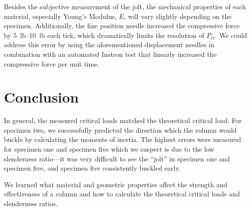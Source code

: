 \documentclass[12 pt]{article}
\begin{document}
Besides the subjective measurement of the jolt, the mechanical properties of each material, especially Young's Modulus, $E$, will vary slightly depending on the specimen. Additionally, the fine position needle increased the compressive force by \qtyrange{5}{10}{lb} each tick, which dramatically limits the resolution of $P_\text{cr}$. We could address this error by using the aforementioned displacement needles in combination with an automated Instron test that linearly increased the compressive force per unit time.



\section{Conclusion} \label{conclusion}
In general, the measured critical loads matched the theoretical critical load. For specimen two, we successfully predicted the direction which the column would buckle by calculating the moments of inertia. The highest errors were measured for specimen one and specimen five which we suspect is due to the low slenderness ratio---it was very difficult to see the ``jolt'' in specimen one and specimen five, and specimen five consistently buckled early.

We learned what material and geometric properties affect the strength and effectiveness of a column and how to calculate the theoretical critical loads and slenderness ratios.
\end{document}

